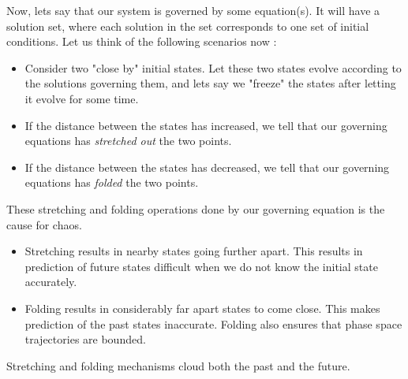 \documentclass{article}
\begin{document}
Now, lets say that our system is governed by some equation(s). It will have a solution set, where each solution in the set corresponds to one set of initial conditions. Let us think of the following scenarios now :
\begin{itemize}
     \item Consider two "close by" initial states. Let these two states evolve according to the solutions governing them, and lets say we "freeze" the states after letting it evolve for some time. 
     \item If the distance between the states has increased, we tell that our governing equations has \emph{stretched out} the two points.
     \item If the distance between the states has decreased, we tell that our governing equations has \emph{folded} the two points.
\end{itemize}
These stretching and folding operations done by our governing equation is the cause for chaos. 
\begin{itemize}
    \item Stretching results in nearby states going further apart. This results in prediction of future states difficult when we do not know the initial state accurately.
    \item Folding results in considerably far apart states to come close. This makes prediction of the past states inaccurate. Folding also ensures that phase space trajectories are bounded.
\end{itemize}
Stretching and folding mechanisms cloud both the past and the future. 
\end{document}
